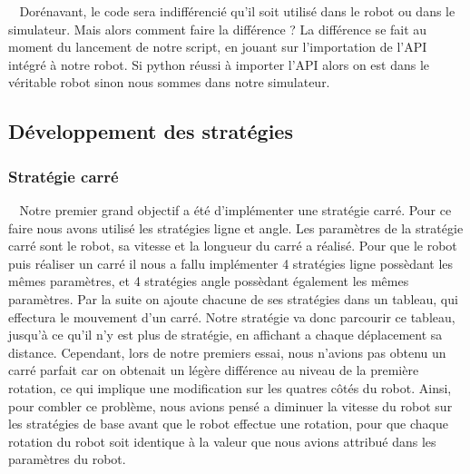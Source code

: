 \documentclass[12pt]{article}
\def\tab{$\>\>\>\>$}
\begin{document}
\tab Dorénavant, le code sera indifférencié qu'il soit utilisé dans le robot ou dans le simulateur. Mais alors comment faire la différence ? La différence se fait au moment du lancement de notre script, en jouant sur l'importation de l'API intégré à notre robot. Si python réussi à importer l'API alors on est dans le véritable robot sinon nous sommes dans notre simulateur.


\newpage
\subsection{Développement des stratégies}
\subsubsection{Stratégie carré}
\tab Notre premier grand objectif a été d'implémenter une stratégie carré. Pour ce faire nous avons utilisé les stratégies ligne et angle. Les paramètres de la stratégie carré sont le robot, sa vitesse et la longueur du carré a réalisé. Pour que le robot puis réaliser un carré il nous a fallu implémenter 4 stratégies ligne possèdant les mêmes paramètres, et 4 stratégies angle possèdant également les mêmes paramètres. Par la suite on ajoute chacune de ses stratégies dans un tableau, qui effectura le mouvement d'un carré. Notre stratégie va donc parcourir ce tableau, jusqu'à ce qu'il n'y est plus de stratégie, en affichant a chaque déplacement sa distance. Cependant, lors de notre premiers essai, nous n'avions pas obtenu un carré parfait car on obtenait un légère différence au niveau de la première rotation, ce qui implique une modification sur les quatres côtés du robot. Ainsi, pour combler ce problème, nous avions pensé a diminuer la vitesse du robot sur les stratégies de base avant que le robot effectue une rotation, pour que chaque rotation du robot soit identique à la valeur que nous avions attribué dans les paramètres du robot.
\end{document}
